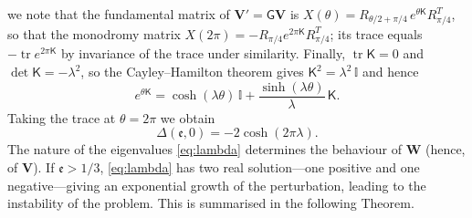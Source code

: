 \documentclass[10pt,a4paper]{amsart}
\newcommand{\Msf}{\mathsf{G}}
\newcommand{\ee}{\mathfrak{e}}
\newcommand{\tr}{\operatorname{tr}}     %
\begin{document}
we note that the fundamental matrix of $\mathbf V'=\Msf\mathbf V$ is $X(\theta)=R_{\theta/2+\pi/4}\,e^{\theta\mathsf K}R_{\pi/4}^T$, so that the monodromy matrix $X(2\pi)=-R_{\pi/4}e^{2\pi\mathsf K}R_{\pi/4}^T$; its trace equals $-\tr e^{2\pi\mathsf K}$ by invariance of the trace under similarity. Finally, $\tr\mathsf K=0$ and $\det\mathsf K=-\lambda^2$, so the Cayley--Hamilton theorem gives $\mathsf K^2=\lambda^2\,\mathbb I$ and hence
\[
e^{\theta\mathsf K}=\cosh(\lambda\theta)\,\mathbb I+\frac{\sinh(\lambda\theta)}{\lambda}\,\mathsf K.
\]
Taking the trace at $\theta=2\pi$ we obtain
\begin{equation}\label{eq:Delta0}
\Delta(\ee,0)=-2\cosh(2\pi\lambda).
\end{equation}
The nature of the eigenvalues \eqref{eq:lambda} determines the behaviour of $\mathbf{W}$ (hence, of $\mathbf{V}$). If $\ee>1/3$, \eqref{eq:lambda} has two real solution---one positive and one negative---giving an exponential growth of the perturbation, leading to the instability of the problem. This is summarised in the following Theorem.
\end{document}
